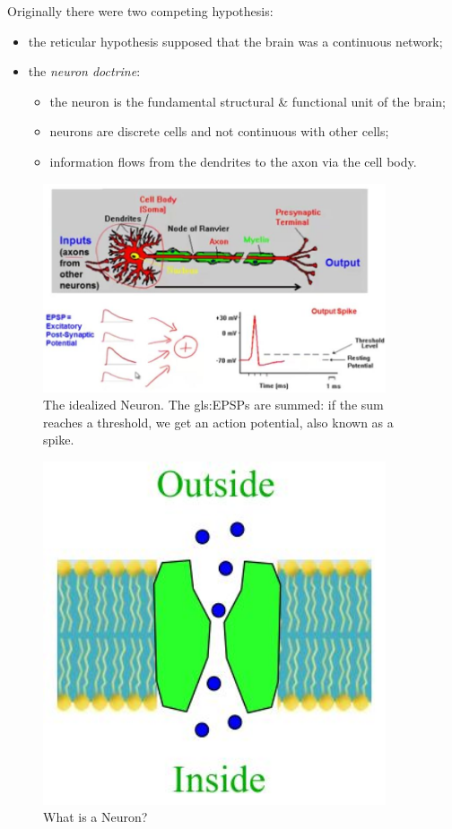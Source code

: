 \documentclass[]{article}
\begin{document}
Originally there were two competing hypothesis:
\begin{itemize}
	\item the reticular hypothesis supposed that the brain was a continuous network;
	\item the \emph{neuron doctrine}:
	\begin{itemize}
		\item the neuron is the fundamental structural \& functional unit of the brain;
		\item neurons are discrete cells and not continuous with other cells;
		\item information flows from the dendrites to the axon via the cell body.
	\end{itemize}
\end{itemize}

\begin{figure}[H]
	\caption[The idealized Neuron]{The idealized Neuron. The \gls{gls:EPSP}s are summed: if the sum reaches a threshold, we get an action potential, also known as a spike.}
	\includegraphics[width=0.9\textwidth]{idealized-neuron}
\end{figure}

\begin{figure}[H]
	\caption[What is a Neuron?]{What is a Neuron?}
	\includegraphics[width=0.9\textwidth]{what-is-a-neuron}
\end{figure}
\end{document}
